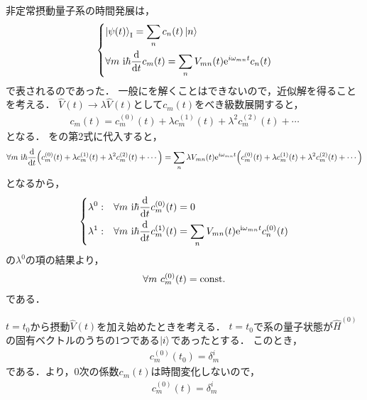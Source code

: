 \documentclass{report}
\begin{document}
  非定常摂動量子系の時間発展は，
  \begin{align}
    \begin{dcases}
      \ket{\psi(t)}_{\mathrm{I}} = \sum_{n}c_n(t)\ket{n} \label{non-steady-quantum-system-re} \\
      \forall m\ \mathrm{i}\hbar\dv{t}c_m(t) = \sum_{n}V_{mn}(t)\mathrm{e}^{i\omega_{mn}t}c_n(t)
    \end{dcases}
  \end{align}
  で表されるのであった．
  一般にを解くことはできないので，近似解を得ることを考える．
  $\hat{V}(t) \to \lambda\hat{V}(t)$として$c_m(t)$をべき級数展開すると，
  \begin{align}
    c_m(t) = c_m^{(0)}(t) + \lambda c_m^{(1)}(t) + \lambda^2c_m^{(2)}(t) + \cdots\label{cnt-taylor-expantion}
  \end{align}
  となる．
  をの第2式に代入すると，
  \begin{align}
    \forall m\  \mathrm{i}\hbar\dv{t}\qty(c_m^{(0)}(t) + \lambda c_m^{(1)}(t) + \lambda^2c_m^{(2)}(t) + \cdots) = \sum_{n}\lambda V_{mn}(t)\mathrm{e}^{i\omega_{mn}t}\qty(c_m^{(0)}(t) + \lambda c_m^{(1)}(t) + \lambda^2c_m^{(2)}(t) + \cdots)
  \end{align}
  となるから，
  \begin{align}
    \begin{dcases}
      \lambda^0 :& \forall m\ \mathrm{i}\hbar\dv{t}c_m^{(0)}(t) = 0 \label{non-steady-quantum-system-re-expantion} \\ 
      \lambda^1 :& \forall m\ \mathrm{i}\hbar\dv{t}c_m^{(1)}(t) = \sum_{n}V_{mn}(t)\mathrm{e}^{\mathrm{i}\omega_{mn}t}c_n^{(0)}(t)
    \end{dcases}
  \end{align}
  の$\lambda^0$の項の結果より，
  \begin{align}
    \forall m\ c_m^{(0)}(t) = \mathrm{const.}\label{non-steady-quantum-system-re-const}
  \end{align}
  である．
  \par
  $t = t_0$から摂動$\hat{V}(t)$を加え始めたときを考える．
  $t = t_0$で系の量子状態が$\hat{H}^{(0)}$の固有ベクトルのうちの1つである$\ket{i}$であったとする．
  このとき，
  \begin{align}
    c_m^{(0)}(t_0) = \delta_m^i
  \end{align}
  である．より，0次の係数$c_m(t)$は時間変化しないので，
  \begin{align}
    c_m^{(0)}(t) = \delta_m^i
  \end{align}
\end{document}
